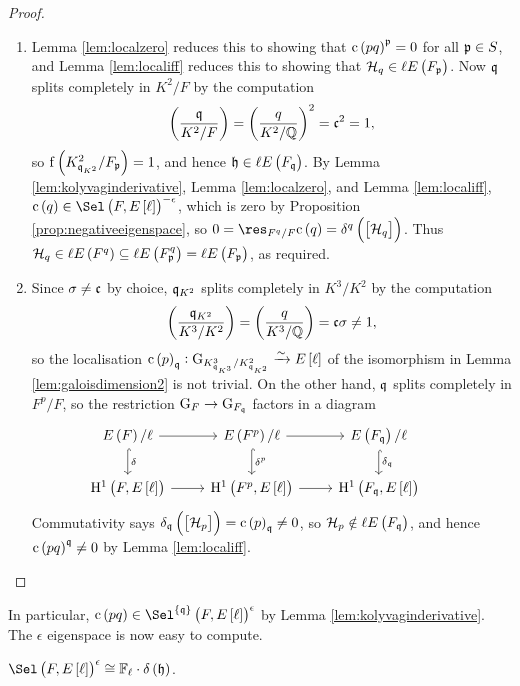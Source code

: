 \begin{proof}
\hfill
\begin{enumerate}
\item Lemma \ref{lem:localzero} reduces this to showing that $ \c\br{pq}^\ppp = 0 $ for all $ \mathfrak{p} \in S $, and Lemma \ref{lem:localiff} reduces this to showing that $ \HHH_q \in \ell E\br{F_\ppp} $. Now $ \mathfrak{q} $ splits completely in $ K^2 / F $ by the computation
$$ \br{\dfrac{\qqq}{K^2 / F}} = \br{\dfrac{q}{K^2 / \QQ}}^2 = \ccc^2 = 1, $$
so $ \f\br{K_{\qqq_{K^2}}^2 / F_\ppp} = 1 $, and hence $ \hhh \in \ell E\br{F_\qqq} $. By Lemma \ref{lem:kolyvaginderivative}, Lemma \ref{lem:localzero}, and Lemma \ref{lem:localiff}, $ \c\br{q} \in \Sel\br{F, E\sbr{\ell}}^{-\epsilon} $, which is zero by Proposition \ref{prop:negativeeigenspace}, so $ 0 = \res_{F^q / F} \c\br{q} = \delta^q\br{\sbr{\HHH_q}} $. Thus $ \HHH_q \in \ell E\br{F^q} \subseteq \ell E\br{F_\ppp^q} = \ell E\br{F_\ppp} $, as required.
\item Since $ \sigma \ne \mathfrak{c} $ by choice, $ \mathfrak{q}_{K^2} $ splits completely in $ K^3 / K^2 $ by the computation
$$ \br{\dfrac{\qqq_{K^2}}{K^3 / K^2}} = \br{\dfrac{q}{K^3 / \QQ}} = \ccc\sigma \ne 1, $$
so the localisation $ \c\br{p}_\qqq : \G_{K_{\qqq_{K^3}}^3 / K_{\qqq_{K^2}}^2} \xrightarrow{\sim} E\sbr{\ell} $ of the isomorphism in Lemma \ref{lem:galoisdimension2} is not trivial. On the other hand, $ \mathfrak{q} $ splits completely in $ F^p / F $, so the restriction $ \mathrm{G}_F \to \mathrm{G}_{F_{\mathfrak{q}}} $ factors in a diagram
$$
\begin{tikzcd}
E\br{F} / \ell \arrow{r} \arrow[hookrightarrow]{d}{\delta} & E\br{F^p} / \ell \arrow{r} \arrow[hookrightarrow]{d}{\delta^p} & E\br{F_\qqq} / \ell \arrow[hookrightarrow]{d}{\delta_\qqq} & \\
\H^1\br{F, E\sbr{\ell}} \arrow{r} & \H^1\br{F^p, E\sbr{\ell}} \arrow{r} & \H^1\br{F_\qqq, E\sbr{\ell}}
\end{tikzcd}
$$
Commutativity says $ \delta_\qqq\br{\sbr{\HHH_p}} = \c\br{p}_\qqq \ne 0 $, so $ \HHH_p \notin \ell E\br{F_\qqq} $, and hence $ \c\br{pq}^\qqq \ne 0 $ by Lemma \ref{lem:localiff}.
\end{enumerate}
\end{proof}

In particular, $ \c\br{pq} \in \Sel^{\cbr{\qqq}}\br{F, E\sbr{\ell}}^\epsilon $ by Lemma \ref{lem:kolyvaginderivative}. The $ \epsilon $ eigenspace is now easy to compute.

\begin{proposition}
\label{prop:positiveeigenspace}
$ \Sel\br{F, E\sbr{\ell}}^\epsilon \cong \FF_\ell \cdot \delta\br{\hhh} $.
\end{proposition}


